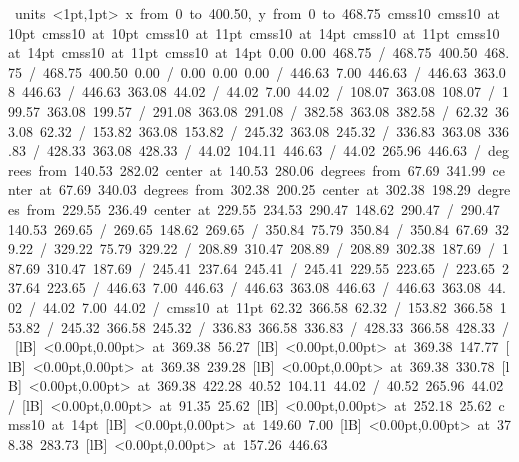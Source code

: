 \hbox{\beginpicture
\setcoordinatesystem units <1pt,1pt>
\setplotarea x from 0 to 400.50, y from 0 to 468.75
\setlinear
\font\picfont cmss10\picfont
\font\picfont cmss10 at 10pt\picfont
\font\picfont cmss10 at 10pt\picfont
\font\picfont cmss10 at 11pt\picfont
\font\picfont cmss10 at 14pt\picfont
\font\picfont cmss10 at 11pt\picfont
\font\picfont cmss10 at 14pt\picfont
\font\picfont cmss10 at 11pt\picfont
\font\picfont cmss10 at 14pt\picfont
\setsolid
{} 0.00 0.00 468.75 /
 468.75 400.50 468.75 /
 468.75 400.50 0.00 /
 0.00 0.00 0.00 /
\setsolid
{} 446.63 7.00 446.63 /
 446.63 363.08 446.63 /
 446.63 363.08 44.02 /
 44.02 7.00 44.02 /
\setsolid
{} 108.07 363.08 108.07 /
\setsolid
{} 199.57 363.08 199.57 /
\setsolid
{} 291.08 363.08 291.08 /
\setsolid
{} 382.58 363.08 382.58 /
\setsolid
{} 62.32 363.08 62.32 /
\setsolid
{} 153.82 363.08 153.82 /
\setsolid
{} 245.32 363.08 245.32 /
\setsolid
{} 336.83 363.08 336.83 /
\setsolid
{} 428.33 363.08 428.33 /
\setsolid
{} 44.02 104.11 446.63 /
\setsolid
{} 44.02 265.96 446.63 /
 degrees from 140.53 282.02 center at 140.53 280.06
 degrees from 67.69 341.99 center at 67.69 340.03
 degrees from 302.38 200.25 center at 302.38 198.29
 degrees from 229.55 236.49 center at 229.55 234.53
\setsolid
{} 290.47 148.62 290.47 /
\setsolid
{} 290.47 140.53 269.65 /
\setsolid
{} 269.65 148.62 269.65 /
\setsolid
{} 350.84 75.79 350.84 /
\setsolid
{} 350.84 67.69 329.22 /
\setsolid
{} 329.22 75.79 329.22 /
\setsolid
{} 208.89 310.47 208.89 /
\setsolid
{} 208.89 302.38 187.69 /
\setsolid
{} 187.69 310.47 187.69 /
\setsolid
{} 245.41 237.64 245.41 /
\setsolid
{} 245.41 229.55 223.65 /
\setsolid
{} 223.65 237.64 223.65 /
\setsolid
{} 446.63 7.00 446.63 /
 446.63 363.08 446.63 /
 446.63 363.08 44.02 /
 44.02 7.00 44.02 /
\font\picfont cmss10 at 11pt\picfont
\setsolid
{} 62.32 366.58 62.32 /
\setsolid
{} 153.82 366.58 153.82 /
\setsolid
{} 245.32 366.58 245.32 /
\setsolid
{} 336.83 366.58 336.83 /
\setsolid
{} 428.33 366.58 428.33 /
  [lB] <0.00pt,0.00pt> at 369.38 56.27
  [lB] <0.00pt,0.00pt> at 369.38 147.77
  [lB] <0.00pt,0.00pt> at 369.38 239.28
  [lB] <0.00pt,0.00pt> at 369.38 330.78
  [lB] <0.00pt,0.00pt> at 369.38 422.28
\setsolid
{} 40.52 104.11 44.02 /
\setsolid
{} 40.52 265.96 44.02 /
  [lB] <0.00pt,0.00pt> at 91.35 25.62
  [lB] <0.00pt,0.00pt> at 252.18 25.62
\font\picfont cmss10 at 14pt\picfont
{}  [lB] <0.00pt,0.00pt> at 149.60 7.00
  [lB] <0.00pt,0.00pt> at 378.38 283.73
  [lB] <0.00pt,0.00pt> at 157.26 446.63
\endpicture
}

